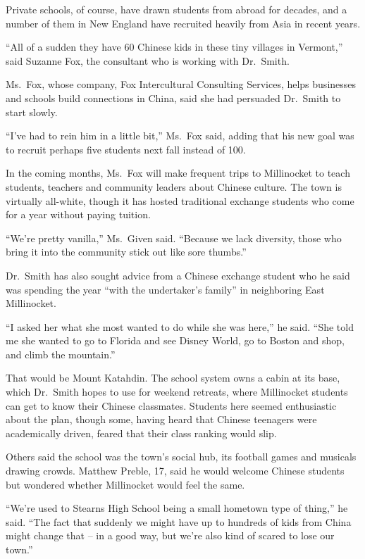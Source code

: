 ﻿\documentclass[12pt]{article}
\begin{document}
Private schools, of course, have drawn students from abroad for decades, and a number of them in New
England have recruited heavily from Asia in recent years.

``All of a sudden they have 60 Chinese kids in these tiny villages in Vermont,'' said Suzanne Fox,
the consultant who is working with Dr.~Smith.

Ms.~Fox, whose company, Fox Intercultural Consulting Services, helps businesses and schools build
connections in China, said she had persuaded Dr.~Smith to start slowly.

``I've had to rein him in a little bit,'' Ms.~Fox said, adding that his new goal was to recruit
perhaps five students next fall instead of 100.

In the coming months, Ms.~Fox will make frequent trips to Millinocket to teach students, teachers
and community leaders about Chinese culture. The town is virtually all-white, though it has hosted
traditional exchange students who come for a year without paying tuition.

``We're pretty vanilla,'' Ms.~Given said. ``Because we lack diversity, those who bring it into the
community stick out like sore thumbs.''

Dr.~Smith has also sought advice from a Chinese exchange student who he said was spending the year
``with the undertaker's family'' in neighboring East Millinocket.

``I asked her what she most wanted to do while she was here,'' he said. ``She told me she wanted to
go to Florida and see Disney World, go to Boston and shop, and climb the mountain.''

That would be Mount Katahdin. The school system owns a cabin at its base, which Dr.~Smith hopes to
use for weekend retreats, where Millinocket students can get to know their Chinese classmates.
Students here seemed enthusiastic about the plan, though some, having heard that Chinese teenagers
were academically driven, feared that their class ranking would slip.

Others said the school was the town's social hub, its football games and musicals drawing crowds.
Matthew Preble, 17, said he would welcome Chinese students but wondered whether Millinocket would
feel the same.

``We're used to Stearns High School being a small hometown type of thing,'' he said. ``The fact that
suddenly we might have up to hundreds of kids from China might change that -- in a good way, but
we're also kind of scared to lose our town.''
\end{document}
